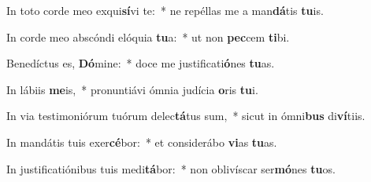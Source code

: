 \item In toto corde meo exqui\textbf{sí}vi te:~* ne repéllas me a man\textbf{dá}tis \textbf{tu}is.
\item In corde meo abscóndi elóquia \textbf{tu}a:~* ut non \textbf{pec}cem \textbf{ti}bi.
\item Benedíctus es, \textbf{Dó}mine:~* doce me justificati\textbf{ó}nes \textbf{tu}as.
\item In lábiis \textbf{me}is,~* pronuntiávi ómnia judícia \textbf{o}ris \textbf{tu}i.
\item In via testimoniórum tuórum delec\textbf{tá}tus sum,~* sicut in ómni\textbf{bus} di\textbf{ví}tiis.
\item In mandátis tuis exer\textbf{cé}bor:~* et considerábo \textbf{vi}as \textbf{tu}as.
\item In justificatiónibus tuis medi\textbf{tá}bor:~* non oblivíscar ser\textbf{mó}nes \textbf{tu}os.
